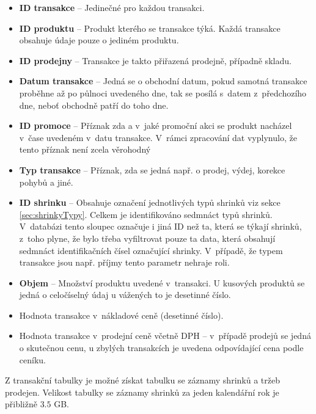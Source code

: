 \begin{itemize}
    \itemsep0em
    \item \textbf{ID transakce} -- Jedinečné pro každou transakci.
    \item \textbf{ID produktu} -- Produkt kterého se transakce týká. Každá transakce obsahuje údaje pouze o jediném produktu. 
    \item \textbf{ID prodejny} -- Transakce je takto přiřazená prodejně, případně skladu. %
    \item \textbf{Datum transakce} -- Jedná se o obchodní datum, pokud samotná transakce proběhne až po půlnoci uvedeného dne, tak se posílá s~datem z~předchozího dne, neboť obchodně patří do toho dne.
    \item \textbf{ID promoce} -- Příznak zda a v~jaké promoční akci se produkt nacházel v~čase uvedeném v~datu transakce. V~rámci zpracování dat vyplynulo, že tento příznak není zcela věrohodný 
    \item \textbf{Typ transakce} -- Příznak, zda se jedná např. o prodej, výdej, korekce pohybů a jiné. 
    \item \textbf{ID shrinku} -- Obsahuje označení jednotlivých typů shrinků viz sekce \ref*{sec:shrinkyTypy}. Celkem je identifikováno sedmnáct typů shrinků. V~databázi tento sloupec označuje i jiná ID než ta, která se týkají shrinků, z~toho plyne, že bylo třeba vyfiltrovat pouze ta data, která obsahují sedmnáct identifikačních čísel označující shrinky. V~případě, že typem transakce jsou např. příjmy tento parametr nehraje roli. %
    \item \textbf{Objem} -- Množství produktu uvedené v~transakci. U kusových produktů se jedná o celočíselný údaj u vážených to je desetinné číslo.
    \item Hodnota transakce v~nákladové ceně (desetinné číslo).
    \item Hodnota transakce v~prodejní ceně včetně DPH -- v~případě prodejů se jedná o skutečnou cenu, u zbylých transakcích je uvedena odpovídající cena podle ceníku.
\end{itemize}
Z transakční tabulky je možné získat tabulku se záznamy shrinků a tržeb prodejen. Velikost tabulky se záznamy shrinků za jeden kalendářní rok je přibližně $3.5$ GB.

